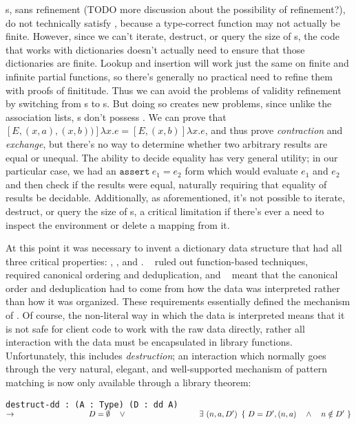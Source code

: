 {\FPF}s, sans refinement (TODO more discussion about the possibility of refinement?), do not technically
satisfy \SemTot, because a type-correct function may not
actually be finite. However, since we can't iterate, destruct, or query the size of {\FPF}s, the code
that works with dictionaries doesn't actually need to ensure that those dictionaries are finite. Lookup
and insertion will work just the same on finite and infinite partial functions, so there's generally no
practical need to refine them with proofs of finititude. Thus we can avoid the problems of validity refinement
by switching from {\CAL}s to {\FPF}s. But doing so creates new problems, since unlike the association lists,
{\FPF}s don't possess \EqDec. We can prove that
\mbox{$[E, (x, a), (x, b))]\lambda x . e = [E, (x, b)]\lambda x . e$}, and thus prove \emph{contraction} and
\emph{exchange}, but there's no way to determine whether two arbitrary results are equal or unequal.
The ability to decide equality has very general utility; in our particular case, we had an
\mbox{$\texttt{assert}~ e_1 = e_2$} form which would evaluate $e_1$ and $e_2$ and then check if the results
were equal, naturally requiring that equality of results be decidable. Additionally, as aforementioned,
it's not possible to iterate, destruct, or query the size of {\FPF}s, a critical limitation if there's
ever a need to inspect the environment or delete a mapping from it.

At this point it was necessary to invent a dictionary data structure that had all three critical properties:
\SemTot, \SemInj, and \EqDec. \EqDec~ ruled out function-based techniques, \SemInj~ required canonical
ordering and deduplication, and \SemTot~ meant that the canonical order and deduplication had to come from
how the data was interpreted rather than how it was organized. These requirements essentially defined the
mechanism of \dds. Of course, the non-literal way in which the data is interpreted means that it is not
safe for client code to work with the raw data directly, rather all interaction with the data must be
encapsulated in library functions. Unfortunately, this includes \emph{destruction}; an interaction which
normally goes through the very natural, elegant, and well-supported mechanism of pattern matching is now
only available through a library theorem:

\texttt{destruct-dd : (A : Type) (D : dd A) $\rightarrow \\
\phantom{xxxxxxxxxxxxxxxx} D = \emptyset \quad \lor \\
\phantom{xxxxxxxxxxxxxxxx} \exists~(n, a, D')~\left\{~ D = D' , (n, a) \quad \land \quad n \notin D' ~\right\}$}

